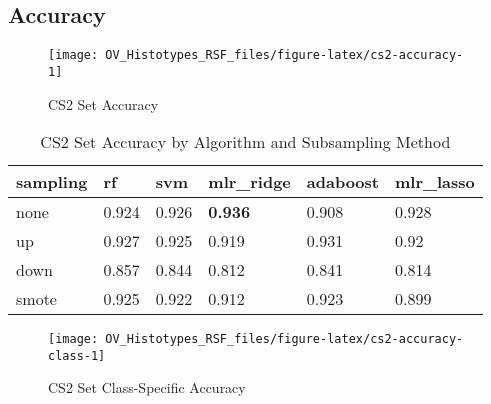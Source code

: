 \documentclass[
]{report}
\begin{document}
\hypertarget{accuracy-3}{%
\subsection{Accuracy}\label{accuracy-3}}

\begin{figure}[H]

{\centering \texttt{[image: OV\_Histotypes\_RSF\_files/figure-latex/cs2-accuracy-1]} 

}

\caption{CS2 Set Accuracy}\label{fig:cs2-accuracy}
\end{figure}

\begin{table}

\caption{\label{tab:cs2-accuracy-table}CS2 Set Accuracy by Algorithm and Subsampling Method}
\centering
\begin{tabular}[t]{l|l|l|l|l|l}
\hline
sampling & rf & svm & mlr\_ridge & adaboost & mlr\_lasso\\
\hline
none & 0.924 & 0.926 & \textbf{0.936} & 0.908 & 0.928\\
\hline
up & 0.927 & 0.925 & 0.919 & 0.931 & 0.92\\
\hline
down & 0.857 & 0.844 & 0.812 & 0.841 & 0.814\\
\hline
smote & 0.925 & 0.922 & 0.912 & 0.923 & 0.899\\
\hline
\end{tabular}
\end{table}

\begin{figure}[H]

{\centering \texttt{[image: OV\_Histotypes\_RSF\_files/figure-latex/cs2-accuracy-class-1]} 

}

\caption{CS2 Set Class-Specific Accuracy}\label{fig:cs2-accuracy-class}
\end{figure}
\end{document}
